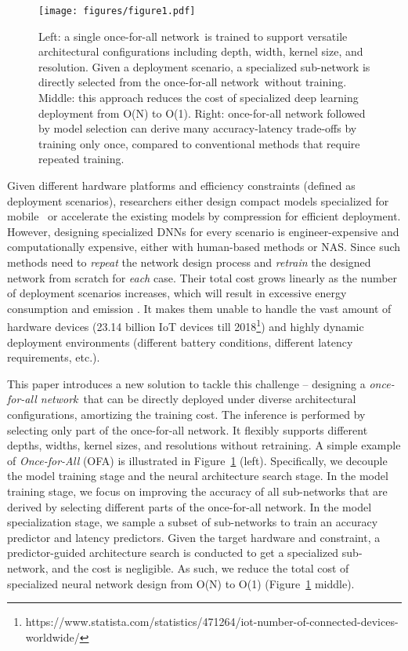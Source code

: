 \documentclass{article} \usepackage{iclr2020_conference,times}
\newcommand{\motherNet}{once-for-all network}
\begin{document}
\begin{figure}[t]
    \vspace{-5pt}
    \centering
    \texttt{[image: figures/figure1.pdf]}
    \caption{Left: a single \motherNet~is trained to support versatile architectural configurations including depth, width, kernel size, and resolution. Given a deployment scenario, a specialized sub-network is directly selected from the \motherNet~without training. Middle: this approach reduces the cost of specialized deep learning deployment from O(N) to O(1). Right: once-for-all network followed by model selection can derive many accuracy-latency trade-offs by training only once, compared to conventional methods that require repeated training. 
    }\label{fig:large_scale_deep_learning_deployment}
\end{figure}

Given different hardware platforms and efficiency constraints (defined as deployment scenarios), researchers either design compact models specialized for mobile~\citep{howard2017mobilenets,sandler2018mobilenetv2,zhang2018shufflenet} or accelerate the existing models by compression \citep{han2016deep, he2018amc} for efficient deployment. However, designing specialized DNNs for every scenario is engineer-expensive and computationally expensive, either with human-based methods or NAS. Since such methods need to \emph{repeat} the network design process and \emph{retrain} the designed network from scratch for \emph{each} case. Their total cost grows linearly as the number of deployment scenarios increases, which will result in excessive energy consumption and  emission \citep{strubell2019energy}. It makes them unable to handle the vast amount of hardware devices (23.14 billion IoT devices till 2018\footnote{https://www.statista.com/statistics/471264/iot-number-of-connected-devices-worldwide/}) and highly dynamic deployment environments (different battery conditions, different latency requirements, etc.). 

This paper introduces a new solution to tackle this challenge -- designing a \textit{\motherNet}~that can be directly deployed under diverse architectural configurations, amortizing the training cost. The inference is performed by selecting only part of the \motherNet. It flexibly supports different depths, widths, kernel sizes, and resolutions without retraining.
A simple example of \emph{Once-for-All} (OFA) is illustrated in Figure~\ref{fig:large_scale_deep_learning_deployment} (left). Specifically, we decouple the model training stage and the neural architecture search stage. In the model training stage, we focus on improving the accuracy of all sub-networks that are derived by selecting different parts of the \motherNet. 
In the model specialization stage, we sample a subset of sub-networks to train an accuracy predictor and latency predictors. Given the target hardware and constraint, a predictor-guided architecture search \citep{liu2018progressive} is conducted to get a specialized sub-network, and the cost is negligible.  As such, we reduce the total cost of specialized neural network design from O(N) to O(1) (Figure~\ref{fig:large_scale_deep_learning_deployment} middle). 
\end{document}
